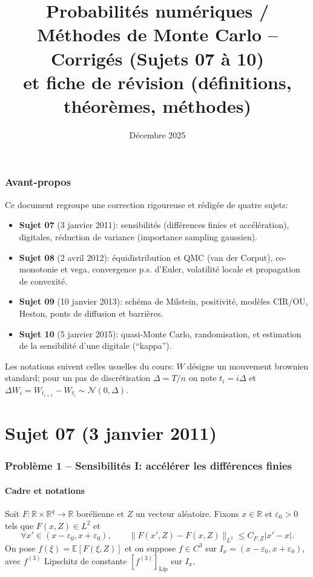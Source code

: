 \documentclass[11pt,a4paper]{article}
\title{Probabilités numériques / Méthodes de Monte Carlo -- Corrigés (Sujets 07 à 10) \\
\large et fiche de révision (définitions, théorèmes, méthodes)}
\author{}
\date{Décembre 2025}
\newcommand{\E}{\mathbb{E}}
\newcommand{\R}{\mathbb{R}}
\newcommand{\1}{\mathbbm{1}}
\newcommand{\Lip}{\mathrm{Lip}}
\theoremstyle{plain}
\theoremstyle{definition}
\begin{document}
\maketitle
\tableofcontents
\bigskip

\section*{Avant-propos}
Ce document regroupe une correction rigoureuse et rédigée de quatre sujets:
\begin{itemize}[leftmargin=*]
  \item \textbf{Sujet 07} (3 janvier 2011): sensibilités (différences finies et accélération), digitales, réduction de variance (importance sampling gaussien).
  \item \textbf{Sujet 08} (2 avril 2012): équidistribution et QMC (van der Corput), co-monotonie et vega, convergence p.s. d'Euler, volatilité locale et propagation de convexité.
  \item \textbf{Sujet 09} (10 janvier 2013): schéma de Milstein, positivité, modèles CIR/OU, Heston, ponts de diffusion et barrières.
  \item \textbf{Sujet 10} (5 janvier 2015): quasi-Monte Carlo, randomisation, et estimation de la sensibilité d'une digitale (``kappa'').
\end{itemize}
Les notations suivent celles usuelles du cours: $W$ désigne un mouvement brownien standard; pour un pas de discrétisation $\Delta=T/n$ on note $t_i=i\Delta$ et $\Delta W_i = W_{t_{i+1}}-W_{t_i}\sim\mathcal{N}(0,\Delta)$.

\part{Sujet 07 (3 janvier 2011)}

\section{Problème 1 -- Sensibilités I: accélérer les différences finies}
\subsection{Cadre et notations}
Soit $F:\R\times\R^q\to\R$ borélienne et $Z$ un vecteur aléatoire. Fixons $x\in\R$ et $\varepsilon_0>0$ tels que $F(x,Z)\in L^2$ et
\begin{equation}\label{eq:L2-Lip-F}
  \forall x'\in (x-\varepsilon_0,x+\varepsilon_0),\qquad \|F(x',Z)-F(x,Z)\|_{L^2}\le C_{F,Z}|x'-x|.
\end{equation}
On pose $f(\xi)=\E[F(\xi,Z)]$ et on suppose $f\in C^3$ sur $I_x=(x-\varepsilon_0,x+\varepsilon_0)$, avec $f^{(3)}$ Lipschitz de constante $[f^{(3)}]_{\Lip}$ sur $I_x$.
\end{document}
